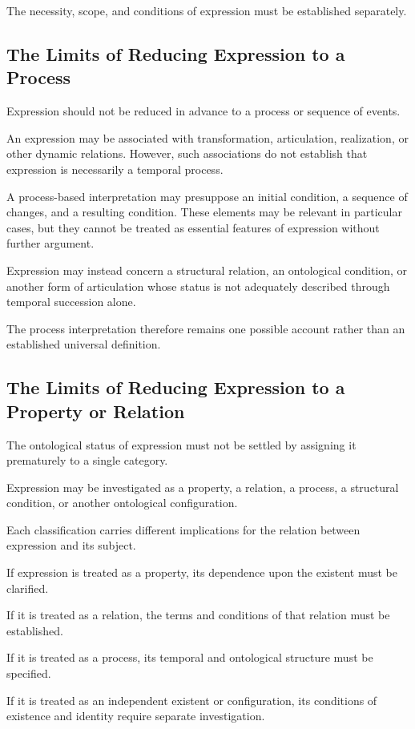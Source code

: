 The necessity, scope, and conditions of expression
must be established separately.

\subsection{The Limits of Reducing Expression to a Process}

Expression should not be reduced in advance to
a process or sequence of events.

An expression may be associated with transformation,
articulation, realization, or other dynamic relations.
However, such associations do not establish that
expression is necessarily a temporal process.

A process-based interpretation may presuppose
an initial condition, a sequence of changes,
and a resulting condition. These elements may
be relevant in particular cases, but they cannot
be treated as essential features of expression
without further argument.

Expression may instead concern a structural relation,
an ontological condition, or another form of
articulation whose status is not adequately
described through temporal succession alone.

The process interpretation therefore remains
one possible account rather than an established
universal definition.

\subsection{The Limits of Reducing Expression to a Property or Relation}

The ontological status of expression must not
be settled by assigning it prematurely to a
single category.

Expression may be investigated as a property,
a relation, a process, a structural condition,
or another ontological configuration.

Each classification carries different implications
for the relation between expression and its subject.

If expression is treated as a property, its
dependence upon the existent must be clarified.

If it is treated as a relation, the terms and
conditions of that relation must be established.

If it is treated as a process, its temporal and
ontological structure must be specified.

If it is treated as an independent existent or
configuration, its conditions of existence and
identity require separate investigation.

